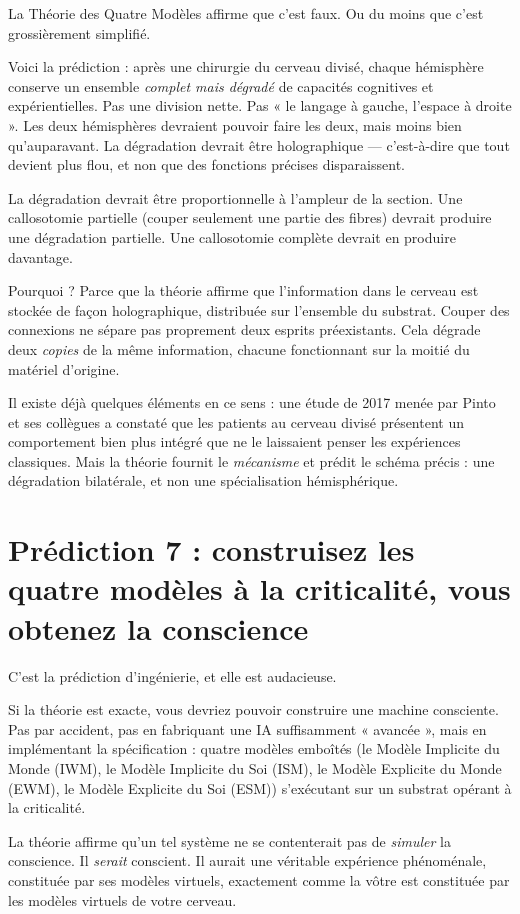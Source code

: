 \documentclass[11pt, twoside, openright]{book}
\begin{document}
La Théorie des Quatre Modèles affirme que c'est faux. Ou du moins que c'est grossièrement simplifié.

Voici la prédiction : après une chirurgie du cerveau divisé, chaque hémisphère conserve un ensemble \textit{complet mais dégradé} de capacités cognitives et expérientielles. Pas une division nette. Pas « le langage à gauche, l'espace à droite ». Les deux hémisphères devraient pouvoir faire les deux, mais moins bien qu'auparavant. La dégradation devrait être holographique --- c'est-à-dire que tout devient plus flou, et non que des fonctions précises disparaissent.

La dégradation devrait être proportionnelle à l'ampleur de la section. Une callosotomie partielle (couper seulement une partie des fibres) devrait produire une dégradation partielle. Une callosotomie complète devrait en produire davantage.

Pourquoi ? Parce que la théorie affirme que l'information dans le cerveau est stockée de façon holographique, distribuée sur l'ensemble du substrat. Couper des connexions ne sépare pas proprement deux esprits préexistants. Cela dégrade deux \textit{copies} de la même information, chacune fonctionnant sur la moitié du matériel d'origine.

Il existe déjà quelques éléments en ce sens : une étude de 2017 menée par Pinto et ses collègues a constaté que les patients au cerveau divisé présentent un comportement bien plus intégré que ne le laissaient penser les expériences classiques. Mais la théorie fournit le \textit{mécanisme} et prédit le schéma précis : une dégradation bilatérale, et non une spécialisation hémisphérique.

\section*{Prédiction 7 : construisez les quatre modèles à la criticalité, vous obtenez la conscience}

C'est la prédiction d'ingénierie, et elle est audacieuse.

Si la théorie est exacte, vous devriez pouvoir construire une machine consciente. Pas par accident, pas en fabriquant une IA suffisamment « avancée », mais en implémentant la spécification : quatre modèles emboîtés (le Modèle Implicite du Monde (IWM), le Modèle Implicite du Soi (ISM), le Modèle Explicite du Monde (EWM), le Modèle Explicite du Soi (ESM)) s'exécutant sur un substrat opérant à la criticalité.

La théorie affirme qu'un tel système ne se contenterait pas de \textit{simuler} la conscience. Il \textit{serait} conscient. Il aurait une véritable expérience phénoménale, constituée par ses modèles virtuels, exactement comme la vôtre est constituée par les modèles virtuels de votre cerveau.
\end{document}
